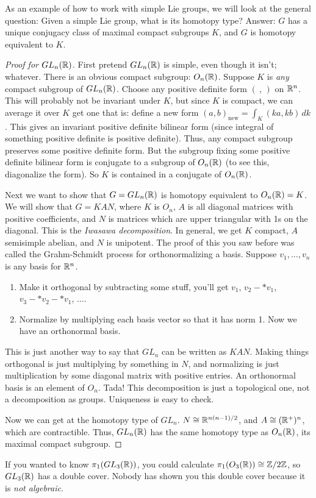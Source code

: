  As an example of how to work with simple Lie groups, we will look at the
 general question: Given a simple Lie group, what is its homotopy type?
 Answer: $G$ has a unique conjugacy class of maximal compact subgroups $K$, and $G$ is
 homotopy equivalent to $K$.
 \begin{proof}[Proof for $GL_n(\mathbb{R})$]
   First pretend $GL_n(\mathbb{R})$ is simple, even though it isn't; whatever. There is an
   obvious compact subgroup: $O_n(\mathbb{R})$.  Suppose $K$ is \emph{any} compact subgroup of
   $GL_n(\mathbb{R})$. Choose any positive definite form $(\ ,\,)$ on $\mathbb{R}^n$. This will
   probably not be invariant under $K$, but since $K$ is compact, we can average it
   over $K$ get one that is: define a new form
   $(a,b)_{\mathrm{new}} = \int_K (ka,kb)\, dk$. This gives an
   invariant positive definite bilinear form (since integral of something
   positive definite is
   positive definite). Thus, any compact subgroup preserves some positive definite
   form. But the subgroup fixing some positive definite bilinear form is conjugate to
   a subgroup of $O_n(\mathbb{R})$ (to see this, diagonalize the form). So $K$ is contained
   in a conjugate of $O_n(\mathbb{R})$.

   Next we want to show that $G=GL_n(\mathbb{R})$ is homotopy equivalent to $O_n(\mathbb{R})=K$. We
   will show that $G=KAN$, where $K$ is $O_n$, $A$ is all diagonal matrices with
   positive coefficients, and $N$ is matrices which are upper triangular with 1s on
   the diagonal. This is the \emph{Iwasawa decomposition}. In general, we get $K$ compact,
   $A$ semisimple abelian, and $N$ is unipotent. The proof of this you saw before was
   called the Grahm-Schmidt process for orthonormalizing a basis. Suppose $v_1,\dots,
   v_n$ is any basis for $\mathbb{R}^n$.
   \begin{enumerate}
     \item Make it orthogonal by subtracting some stuff, you'll get $v_1$,
     $v_2-\ast v_1$, $v_3 - \ast v_2 - \ast v_1$, $\dots$.
     \item Normalize by multiplying each basis vector so that it has norm 1. Now we
     have an orthonormal basis.
   \end{enumerate}
   This is just another way to say that $GL_n$ can be written as $KAN$. Making things
   orthogonal is just multiplying by something in $N$, and normalizing is just
   multiplication by some diagonal matrix with positive entries. An orthonormal basis
   is an element of $O_n$. Tada! This decomposition is just a topological one, not
   a decomposition as groups. Uniqueness is easy to check.

   Now we can get at the homotopy type of $GL_n$. $N\cong \mathbb{R}^{n(n-1)/2}$, and $A\cong
   (\mathbb{R}^+)^n$, which are contractible. Thus, $GL_n(\mathbb{R})$ has the same homotopy type as
   $O_n(\mathbb{R})$, its maximal compact subgroup.
 \end{proof}
 If you wanted to know $\pi_1(GL_3(\mathbb{R}))$, you could calculate $\pi_1(O_3(\mathbb{R}))\cong
 \mathbb{Z}/2\mathbb{Z}$, so $GL_3(\mathbb{R})$ has a double cover. Nobody has shown you this double cover
 because it is \emph{not algebraic}.

